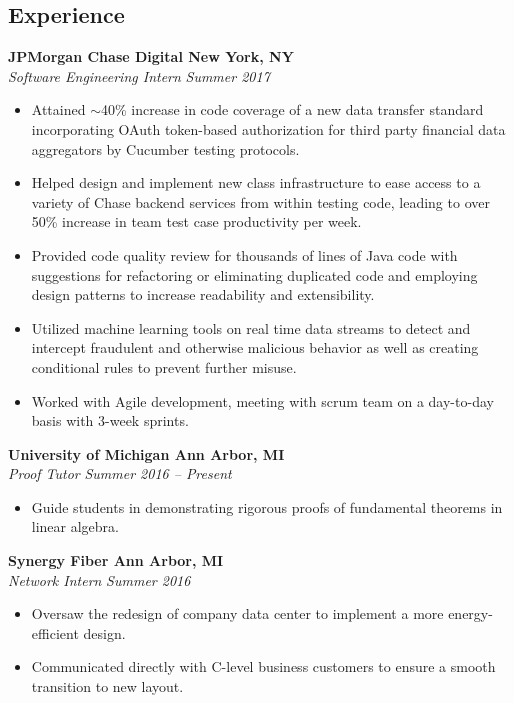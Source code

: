 \documentclass[margin,line]{resume}
\begin{document}
\begin{resume}
	\section{\mysidestyle Experience}
	    
	\textbf{JPMorgan Chase Digital \hfill New York, NY} \\\vspace{1mm}%
	\textsl{Software Engineering Intern} \hfill \textsl{Summer 2017}
	\begin{itemize}[leftmargin=4mm]
		\item Attained $\sim$40\% increase in code coverage of a new data transfer standard incorporating OAuth token-based authorization for third party financial data aggregators by Cucumber testing protocols.
		\item Helped design and implement new class infrastructure to ease access to a variety of Chase backend services from within testing code, leading to over 50\% increase in team test case productivity per week.
		\item Provided code quality review for thousands of lines of Java code with suggestions for refactoring or eliminating duplicated code and employing design patterns to increase readability and extensibility.
		\item Utilized machine learning tools on real time data streams to detect and intercept fraudulent and otherwise malicious behavior as well as creating conditional rules to prevent further misuse. 
		\item Worked with Agile development, meeting with scrum team on a day-to-day basis with 3-week sprints.
	\end{itemize}
	
	\vspace{-1.5mm}
	\textbf{University of Michigan \hfill Ann Arbor, MI} \\\vspace{1mm}%
	\textsl{Proof Tutor} \hfill \textsl{Summer 2016 -- Present}
	\begin{itemize}[leftmargin=4mm]
		\item Guide students in demonstrating rigorous proofs of fundamental theorems in linear algebra.
	\end{itemize}
	
	\vspace{-1.5mm}
	\textbf{Synergy Fiber \hfill Ann Arbor, MI} \\\vspace{1mm}%
	\textsl{Network Intern} \hfill \textsl{Summer 2016}
	\begin{itemize}[leftmargin=4mm]
		\item Oversaw the redesign of company data center to implement a more energy-efficient design.
		\item Communicated directly with C-level business customers to ensure a smooth transition to new layout. 
	\end{itemize}
	\vspace{1.5mm}
	

\end{resume}
\end{document}
